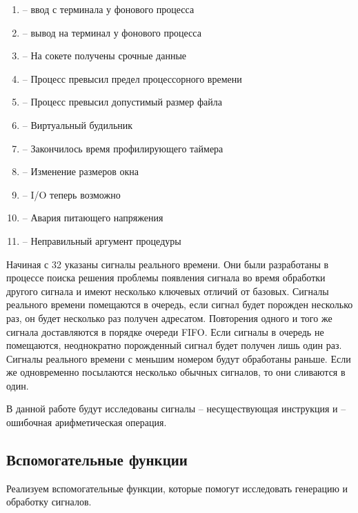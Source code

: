 \begin{enumerate}[itemsep=-0.2em]
	\item {} -- ввод с терминала у фонового процесса
	\item {} -- вывод на терминал у фонового процесса
	\item {} -- На сокете получены срочные данные
	\item {} -- Процесс превысил предел процессорного времени
	\item {} -- Процесс превысил допустимый размер файла
	\item {} -- Виртуальный будильник
	\item {} -- Закончилось время профилирующего таймера
	\item {} -- Изменение размеров окна
	\item {} -- I/O теперь возможно
	\item {} -- Авария питающего напряжения
	\item {} -- Неправильный аргумент процедуры
\end{enumerate}

Начиная с 32 указаны сигналы реального времени. Они были разработаны в процессе поиска решения проблемы появления сигнала во время обработки другого сигнала и имеют несколько ключевых отличий от базовых. Сигналы реального времени помещаются в очередь, если сигнал будет порожден несколько раз, он будет несколько раз получен адресатом. Повторения одного и того же сигнала доставляются в порядке очереди FIFO. Если сигналы в очередь не помещаются, неоднократно порожденный сигнал будет получен лишь один раз. Сигналы реального времени с меньшим номером будут обработаны раньше. Если же одновременно посылаются несколько обычных сигналов, то они сливаются в один.

В данной работе будут исследованы сигналы  -- несуществующая инструкция и  -- ошибочная арифметическая операция.

\subsection{Вспомогательные функции}

Реализуем вспомогательные функции, которые помогут исследовать генерацию и обработку сигналов.





